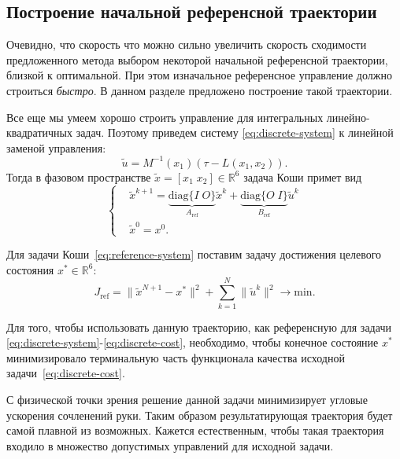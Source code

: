 \subsection{Построение начальной референсной траектории}

Очевидно, что скорость что можно сильно увеличить скорость сходимости предложенного метода выбором некоторой начальной референсной траектории, близкой к оптимальной.
При этом изначальное референсное управление должно строиться \textit{быстро}.
В данном разделе предложено построение такой траектории.

Все еще мы умеем хорошо строить управление для интегральных линейно-квадратичных задач.
Поэтому приведем систему \eqref{eq:discrete-system} к линейной заменой управления:
\begin{equation}
    \tilde u = M^{-1}(x_1) (\tau - L(x_1, x_2)).
\end{equation}
Тогда в фазовом пространстве $\tilde x = [x_1\; x_2] \in \mathbb{R}^{6}$ задача Коши примет вид
\begin{equation}\label{eq:reference-system}
    \left\{\begin{aligned}
        & \tilde x^{k+1} = \underbrace{\mathrm{diag}\{I\;O\}}_{A_{\mathrm{ref}}} \tilde x^{k} + \underbrace{\mathrm{diag}\{O\;I\}}_{B_{\mathrm{ref}}} \tilde u^{k}
        \\
        & \tilde x^{0} = x^{0}.
    \end{aligned}\right.
\end{equation}

Для задачи Коши~\eqref{eq:reference-system} поставим задачу достижения целевого состояния $x^* \in \mathbb{R}^{6}$:
\begin{equation}
    J_{\mathrm{ref}} = \|\tilde x^{N+1} - x^*\|^2 + \sum_{k=1}^{N} \|\tilde u^k \|^2 \longrightarrow \mathrm{min}.
\end{equation}

\begin{remark}
    Для того, чтобы использовать данную траекторию, как референсную для задачи \eqref{eq:discrete-system}-\eqref{eq:discrete-cost}, необходимо, чтобы конечное состояние $x^*$ минимизировало терминальную часть функционала качества исходной задачи~\eqref{eq:discrete-cost}.
\end{remark}

\begin{remark}
    С физической точки зрения решение данной задачи минимизирует угловые ускорения сочленений руки.
    Таким образом результатирующая траектория будет самой плавной из возможных.
    Кажется естественным, чтобы такая траектория входило в множество допустимых управлений для исходной задачи.
\end{remark}

